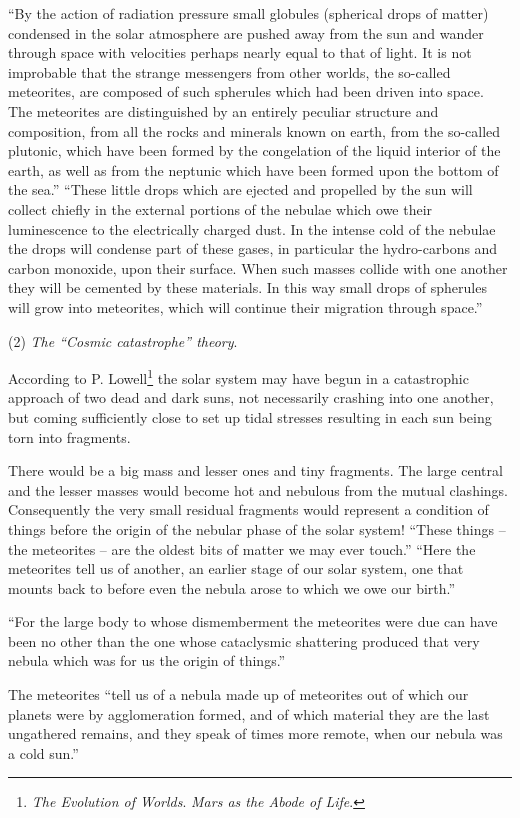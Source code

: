 \documentclass[a4paper, 12pt, oneside]{article}
\begin{document}
``By the action of radiation pressure small globules (spherical drops of matter) condensed in the solar atmosphere are pushed away from the sun and wander through space with velocities perhaps nearly equal to that of light. It is not improbable that the strange messengers from other worlds, the so-called meteorites, are composed of such spherules which had been driven into space. The meteorites are distinguished by an entirely peculiar structure and composition, from all the rocks and minerals known on earth, from the so-called plutonic, which have been formed by the congelation of the liquid interior of the earth, as well as from the neptunic which have been formed upon the bottom of the sea.'' ``These little drops which are ejected and propelled by the sun will collect chiefly in the external portions of the nebulae which owe their luminescence to the electrically charged dust. In the intense cold of the nebulae the drops will condense part of these gases, in particular the hydro-carbons and carbon monoxide, upon their surface. When such masses collide with one another they will be cemented by these materials. In this way small drops of spherules will grow into meteorites, which will continue their migration through space.''

(2) \emph{The ``Cosmic catastrophe'' theory}.

According to P. Lowell\footnote{\emph{The Evolution of Worlds}. \emph{Mars as the Abode of Life}.} the solar system may have begun in a catastrophic approach of two dead and dark suns, not necessarily crashing into one another, but coming sufficiently close to set up tidal stresses resulting in each sun being torn into fragments.

There would be a big mass and lesser ones and tiny fragments. The large central and the lesser masses would become hot and nebulous from the mutual clashings. Consequently the very small residual fragments would represent a condition of things before the origin of the nebular phase of the solar system! ``These things -- the meteorites -- are the oldest bits of matter we may ever touch.'' ``Here the meteorites tell us of another, an earlier stage of our solar system, one that mounts back to before even the nebula arose to which we owe our birth.''

``For the large body to whose dismemberment the meteorites were due can have been no other than the one whose cataclysmic shattering produced that very nebula which was for us the origin of things.''

The meteorites ``tell us of a nebula made up of meteorites out of which our planets were by agglomeration formed, and of which material they are the last ungathered remains, and they speak of times more remote, when our nebula was a cold sun.''
\end{document}
